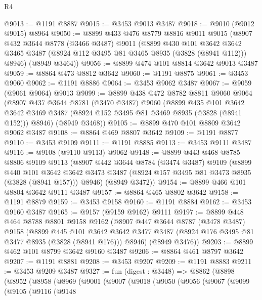 \begin{lexlean}{R4}
\begin{coremodule}
@9013 := @1191 @8887
@9015 := @3453 @9013 @3487
@9018 := @9010 (@9012 @9015) @8964
@9050 := @8899
    @433
    @476
    @8779
    @8816
    @9011
    @9015
    (@8907
      @432
      @3644
      @8778
      (@3466 @3487)
      @9011
      (@8899
        @430
        @101
        @3642
        @3642
        @3465
        @3487
        (@8924 @112 @3495 @81 @3465 @8935 (@3828 (@8941 @112)))
        @8946)
      (@8949 @3464))
@9056 := @8899 @474 @101 @8814 @3642 @9013 @3487
@9059 := @8864 @473 @8812 @3642
@9060 := @1191 @8875
@9061 := @3453 @9060
@9062 := @1191 @8886
@9064 := @3453 @9062 @3487
@9067 := @9059 (@9061 @9064) @9013
@9099 := @8899
    @438
    @472
    @8782
    @8811
    @9060
    @9064
    (@8907
      @437
      @3644
      @8781
      (@3470 @3487)
      @9060
      (@8899
        @435
        @101
        @3642
        @3642
        @3469
        @3487
        (@8924 @152 @3495 @81 @3469 @8935 (@3828 (@8941 @152)))
        @8946)
      (@8949 @3468))
@9105 := @8899 @470 @101 @8809 @3642 @9062 @3487
@9108 := @8864 @469 @8807 @3642
@9109 := @1191 @8877
@9110 := @3453 @9109
@9111 := @1191 @8885
@9113 := @3453 @9111 @3487
@9116 := @9108 (@9110 @9113) @9062
@9148 := @8899
    @443
    @468
    @8785
    @8806
    @9109
    @9113
    (@8907
      @442
      @3644
      @8784
      (@3474 @3487)
      @9109
      (@8899
        @440
        @101
        @3642
        @3642
        @3473
        @3487
        (@8924 @157 @3495 @81 @3473 @8935 (@3828 (@8941 @157)))
        @8946)
      (@8949 @3472))
@9154 := @8899 @466 @101 @8804 @3642 @9111 @3487
@9157 := @8864 @465 @8802 @3642
@9158 := @1191 @8879
@9159 := @3453 @9158
@9160 := @1191 @8884
@9162 := @3453 @9160 @3487
@9165 := @9157 (@9159 @9162) @9111
@9197 := @8899
    @448
    @464
    @8788
    @8801
    @9158
    @9162
    (@8907
      @447
      @3644
      @8787
      (@3478 @3487)
      @9158
      (@8899
        @445
        @101
        @3642
        @3642
        @3477
        @3487
        (@8924 @176 @3495 @81 @3477 @8935 (@3828 (@8941 @176)))
        @8946)
      (@8949 @3476))
@9203 := @8899 @462 @101 @8799 @3642 @9160 @3487
@9206 := @8864 @461 @8797 @3642
@9207 := @1191 @8881
@9208 := @3453 @9207
@9209 := @1191 @8883
@9211 := @3453 @9209 @3487
@9327 := fun (digest : @3448) =>
  @8862
    (@8898
      (@8952
        (@8958
          (@8969
            (@9001
              (@9007
                (@9018
                  (@9050
                    (@9056
                      (@9067
                        (@9099
                          (@9105
                            (@9116
                              (@9148

\end{coremodule}
\end{lexlean}
